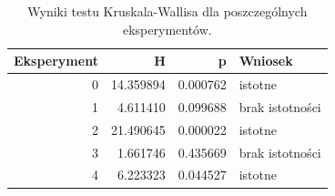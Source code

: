 \begin{table}
\caption{Wyniki testu Kruskala-Wallisa dla poszczególnych eksperymentów.}
\label{tab:kruskal_exp}
\begin{tabular}{rrrl}
\toprule
Eksperyment & H & p & Wniosek \\
\midrule
0 & 14.359894 & 0.000762 & istotne \\
1 & 4.611410 & 0.099688 & brak istotności \\
2 & 21.490645 & 0.000022 & istotne \\
3 & 1.661746 & 0.435669 & brak istotności \\
4 & 6.223323 & 0.044527 & istotne \\
\bottomrule
\end{tabular}
\end{table}
